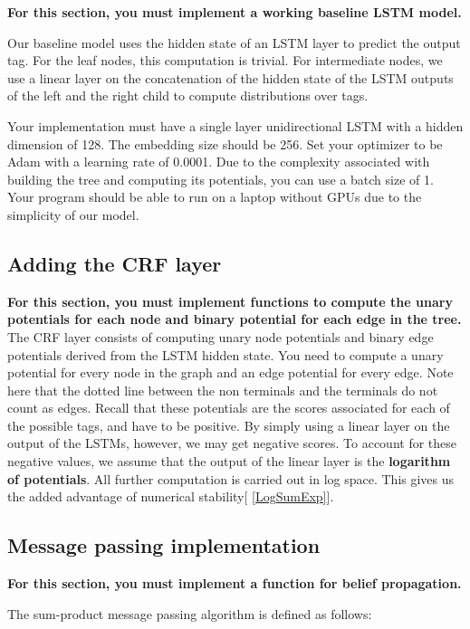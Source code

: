 \documentclass[11pt,addpoints,answers]{exam}
\numberwithin{equation}{section} %
\numberwithin{figure}{section} %
\numberwithin{table}{section} %
\begin{document}
\textbf{For this section,  you must implement a working baseline LSTM model.}


Our baseline model uses the hidden state of an LSTM layer to predict the output tag. For the leaf nodes, this computation is trivial. For intermediate nodes, we use a linear layer on the concatenation of the hidden state of the LSTM outputs of the left and the right child to compute distributions over tags.  

Your implementation must have a single layer unidirectional LSTM with a hidden dimension of 128. The embedding size should be 256. Set your optimizer to be Adam with a learning rate of 0.0001. Due to the complexity associated with building the tree and computing its potentials, you can use a batch size of 1. Your program should be able to run on a laptop without GPUs due to the simplicity of our model.  
 
\subsection{Adding the CRF layer}

\textbf{For this section, you must implement functions to compute the unary potentials for each node and binary potential for each edge in the tree.}
\newline
The CRF layer consists of computing unary node potentials and binary edge potentials derived from the LSTM hidden state. You need to compute a unary potential for every node in the graph and an edge potential for every edge. Note here that the dotted line between the non terminals and the terminals do not count as edges. 
\newline
Recall that these potentials are the scores associated for each of the possible tags, and have to be positive. By simply using a linear layer on the output of the LSTMs, however, we may get negative scores. To account for these negative values, we assume that the output of the linear layer is the \textbf{logarithm of potentials}. All further computation is carried out in log space. This gives us the added advantage of numerical stability[ \ref{LogSumExp}].


\subsection{Message passing implementation}
\textbf{For this section, you must implement a function for belief propagation.}

The sum-product message passing algorithm is defined as follows: 
\end{document}
